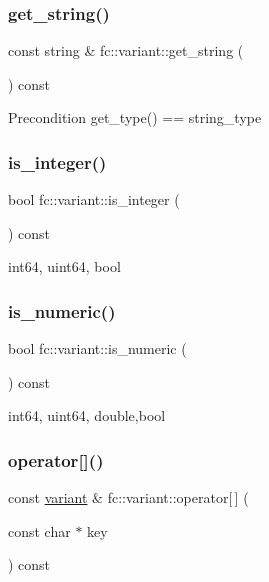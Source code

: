 \subsubsection{\texorpdfstring{get\+\_\+string()}{get\_string()}}
{\footnotesize\ttfamily const string \& fc\+::variant\+::get\+\_\+string (\begin{DoxyParamCaption}{ }\end{DoxyParamCaption}) const}

\begin{DoxyPrecond}{Precondition}
get\+\_\+type() == string\+\_\+type 
\end{DoxyPrecond}
\mbox{\label{classfc_1_1variant_a59f43987b39a2e02b9699e917f5cc3d2}} 
\subsubsection{\texorpdfstring{is\+\_\+integer()}{is\_integer()}}
{\footnotesize\ttfamily bool fc\+::variant\+::is\+\_\+integer (\begin{DoxyParamCaption}{ }\end{DoxyParamCaption}) const}

int64, uint64, bool \mbox{\label{classfc_1_1variant_a5c2238ce8bbeb5dc454134ec92624aab}} 
\subsubsection{\texorpdfstring{is\+\_\+numeric()}{is\_numeric()}}
{\footnotesize\ttfamily bool fc\+::variant\+::is\+\_\+numeric (\begin{DoxyParamCaption}{ }\end{DoxyParamCaption}) const}

int64, uint64, double,bool \mbox{\label{classfc_1_1variant_afc8519b6b2c1c192506a10289196cbf5}} 
\subsubsection{\texorpdfstring{operator[]()}{operator[]()}\hspace{0.1cm}{\footnotesize\ttfamily [1/2]}}
{\footnotesize\ttfamily const \mbox{\hyperlink{classfc_1_1variant}{variant}} \& fc\+::variant\+::operator\mbox{[}$\,$\mbox{]} (\begin{DoxyParamCaption}\item[{const char $\ast$}]{key }\end{DoxyParamCaption}) const}

